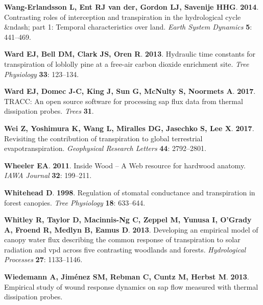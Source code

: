 \documentclass[11pt,twoside]{reedthesis}
\begin{document}
\hypertarget{ref-Wang-Erlandsson2014}{}
\textbf{\textnormal{Wang-Erlandsson L}, \textnormal{Ent RJ van der},
\textnormal{Gordon LJ}, \textnormal{Savenije HHG}}. \textbf{2014}.
Contrasting roles of interception and transpiration in the hydrological
cycle \&ndash; part 1: Temporal characteristics over land. \emph{Earth
System Dynamics} \textbf{5}: 441--469.

\hypertarget{ref-Ward2013}{}
\textbf{\textnormal{Ward EJ}, \textnormal{Bell DM}, \textnormal{Clark
JS}, \textnormal{Oren R}}. \textbf{2013}. Hydraulic time constants for
transpiration of loblolly pine at a free-air carbon dioxide enrichment
site. \emph{Tree Physiology} \textbf{33}: 123--134.

\hypertarget{ref-Ward2017}{}
\textbf{\textnormal{Ward EJ}, \textnormal{Domec J-C}, \textnormal{King
J}, \textnormal{Sun G}, \textnormal{McNulty S}, \textnormal{Noormets
A}}. \textbf{2017}. TRACC: An open source software for processing sap
flux data from thermal dissipation probes. \emph{Trees} \textbf{31}.

\hypertarget{ref-Wei2017}{}
\textbf{\textnormal{Wei Z}, \textnormal{Yoshimura K}, \textnormal{Wang
L}, \textnormal{Miralles DG}, \textnormal{Jasechko S}, \textnormal{Lee
X}}. \textbf{2017}. Revisiting the contribution of transpiration to
global terrestrial evapotranspiration. \emph{Geophysical Research
Letters} \textbf{44}: 2792--2801.

\hypertarget{ref-insidewood}{}
\textbf{\textnormal{Wheeler EA}}. \textbf{2011}. Inside Wood -- A Web
resource for hardwood anatomy. \emph{IAWA Journal} \textbf{32}:
199--211.

\hypertarget{ref-Whitehead1998}{}
\textbf{\textnormal{Whitehead D}}. \textbf{1998}. Regulation of stomatal
conductance and transpiration in forest canopies. \emph{Tree Physiology}
\textbf{18}: 633--644.

\hypertarget{ref-Whitley2013}{}
\textbf{\textnormal{Whitley R}, \textnormal{Taylor D},
\textnormal{Macinnis-Ng C}, \textnormal{Zeppel M}, \textnormal{Yunusa
I}, \textnormal{O'Grady A}, \textnormal{Froend R}, \textnormal{Medlyn
B}, \textnormal{Eamus D}}. \textbf{2013}. Developing an empirical model
of canopy water flux describing the common response of transpiration to
solar radiation and vpd across five contrasting woodlands and forests.
\emph{Hydrological Processes} \textbf{27}: 1133--1146.

\hypertarget{ref-Wiedemann2013}{}
\textbf{\textnormal{Wiedemann A}, \textnormal{Jiménez SM},
\textnormal{Rebman C}, \textnormal{Cuntz M}, \textnormal{Herbst M}}.
\textbf{2013}. Empirical study of wound response dynamics on sap flow
measured with thermal dissipation probes.
\end{document}
